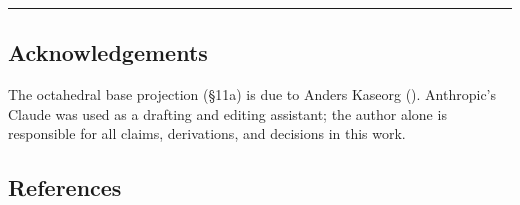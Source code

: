 \documentclass[
  11pt,
  a4paper,
]{article}
\begin{document}
\begin{center}\rule{0.5\linewidth}{0.5pt}\end{center}

\subsection*{Acknowledgements}\label{acknowledgements}

The octahedral base projection (§11a) is due to Anders Kaseorg
(). Anthropic's Claude
was used as a drafting and editing assistant; the author alone is
responsible for all claims, derivations, and decisions in this work.

\subsection*{References}\label{references}
\end{document}
